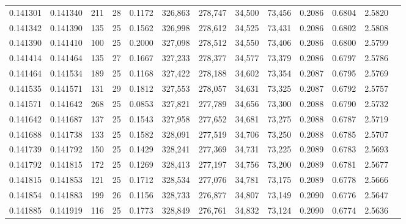 \begin{tabular}{rrrrrrrrrrrrr}
0.141301 & 0.141340 & 211 &  28 &                                     0.1172 & 326,863 & 278,747 &  34,500 &  73,456 & 0.2086 & 0.6804 & 2.5820 \\
0.141342 & 0.141390 & 135 &  25 &                                     0.1562 & 326,998 & 278,612 &  34,525 &  73,431 & 0.2086 & 0.6802 & 2.5808 \\
0.141390 & 0.141410 & 100 &  25 &                                     0.2000 & 327,098 & 278,512 &  34,550 &  73,406 & 0.2086 & 0.6800 & 2.5799 \\
0.141414 & 0.141464 & 135 &  27 &                                     0.1667 & 327,233 & 278,377 &  34,577 &  73,379 & 0.2086 & 0.6797 & 2.5786 \\
0.141464 & 0.141534 & 189 &  25 &                                     0.1168 & 327,422 & 278,188 &  34,602 &  73,354 & 0.2087 & 0.6795 & 2.5769 \\
0.141535 & 0.141571 & 131 &  29 &                                     0.1812 & 327,553 & 278,057 &  34,631 &  73,325 & 0.2087 & 0.6792 & 2.5757 \\
0.141571 & 0.141642 & 268 &  25 &                                     0.0853 & 327,821 & 277,789 &  34,656 &  73,300 & 0.2088 & 0.6790 & 2.5732 \\
0.141642 & 0.141687 & 137 &  25 &                                     0.1543 & 327,958 & 277,652 &  34,681 &  73,275 & 0.2088 & 0.6787 & 2.5719 \\
0.141688 & 0.141738 & 133 &  25 &                                     0.1582 & 328,091 & 277,519 &  34,706 &  73,250 & 0.2088 & 0.6785 & 2.5707 \\
0.141739 & 0.141792 & 150 &  25 &                                     0.1429 & 328,241 & 277,369 &  34,731 &  73,225 & 0.2089 & 0.6783 & 2.5693 \\
0.141792 & 0.141815 & 172 &  25 &                                     0.1269 & 328,413 & 277,197 &  34,756 &  73,200 & 0.2089 & 0.6781 & 2.5677 \\
0.141815 & 0.141853 & 121 &  25 &                                     0.1712 & 328,534 & 277,076 &  34,781 &  73,175 & 0.2089 & 0.6778 & 2.5666 \\
0.141854 & 0.141883 & 199 &  26 &                                     0.1156 & 328,733 & 276,877 &  34,807 &  73,149 & 0.2090 & 0.6776 & 2.5647 \\
0.141885 & 0.141919 & 116 &  25 &                                     0.1773 & 328,849 & 276,761 &  34,832 &  73,124 & 0.2090 & 0.6774 & 2.5636 \\

\end{tabular}
